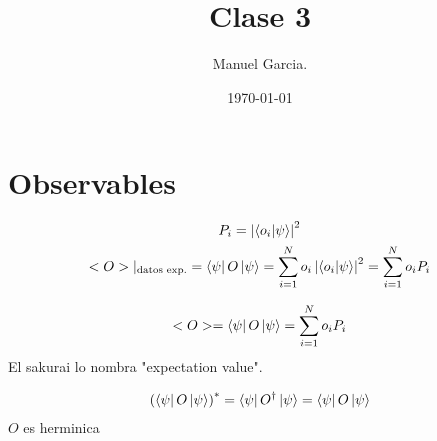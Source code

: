 \documentclass{article}
\title{Clase 3}
\author{Manuel Garcia.}
\date{\today}
\newcommand{\caja}[3]{%
  \begin{tcolorbox}[colback=#1!5!white,colframe=#1!25!black,title=#2]
    #3
  \end{tcolorbox}%
}
\begin{document}
\maketitle

\section{Observables}
\begin{gather}
   P_i  = \left|\bra{o_i }\ket{\psi} \right|^2 \\
   <O>|_{\text{datos exp.}} = \bra{\psi}O \ket{\psi} = \sum_{i=1 }^{N }o_i \left|\bra{o_i }\ket{\psi} \right|^2 = \sum_{i=1 }^{N }o_i P_i  
\end{gather}
\caja{green}{Medicion }{
  \begin{gather}
    <O> = \bra{\psi}O \ket{\psi} =  \sum_{i=1 }^{N }o_i P_i  
    \label{eq:medicion }
  \end{gather}
  El sakurai lo nombra "expectation value".
}
\begin{gather}
   \left(\bra{\psi}O \ket{\psi} \right)^ {*} = \bra{\psi}O ^ {\dag}\ket{\psi}  = \bra{\psi}O \ket{\psi} 
\end{gather}
$O$ es herminica
\end{document}

